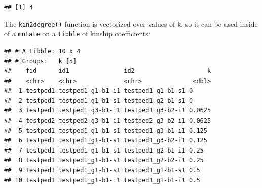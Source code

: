 \documentclass[9pt,a4paper,]{extarticle}
\newenvironment{Shaded}{\begin{snugshade}}{\end{snugshade}}
\newcommand{\CommentTok}[1]{\textcolor[rgb]{0.56,0.35,0.01}{\textit{#1}}}
\newcommand{\DataTypeTok}[1]{\textcolor[rgb]{0.13,0.29,0.53}{#1}}
\newcommand{\DecValTok}[1]{\textcolor[rgb]{0.00,0.00,0.81}{#1}}
\newcommand{\KeywordTok}[1]{\textcolor[rgb]{0.13,0.29,0.53}{\textbf{#1}}}
\newcommand{\NormalTok}[1]{#1}
\newcommand{\OperatorTok}[1]{\textcolor[rgb]{0.81,0.36,0.00}{\textbf{#1}}}
\newcommand{\StringTok}[1]{\textcolor[rgb]{0.31,0.60,0.02}{#1}}
\begin{document}
\begin{verbatim}
## [1] 4
\end{verbatim}

The \texttt{kin2degree()} function is vectorized over values of \texttt{k}, so it can be used inside of a \texttt{mutate} on a \texttt{tibble} of kinship coefficients:

\begin{Shaded}
\end{Shaded}

\begin{verbatim}
## # A tibble: 10 x 4
## # Groups:   k [5]
##    fid      id1               id2                    k
##    <chr>    <chr>             <chr>              <dbl>
##  1 testped1 testped1_g1-b1-i1 testped1_g1-b1-s1 0     
##  2 testped1 testped1_g1-b1-s1 testped1_g2-b1-s1 0     
##  3 testped1 testped1_g3-b1-i1 testped1_g3-b2-i1 0.0625
##  4 testped2 testped2_g3-b1-i1 testped2_g3-b2-i1 0.0625
##  5 testped1 testped1_g1-b1-s1 testped1_g3-b1-i1 0.125 
##  6 testped1 testped1_g1-b1-s1 testped1_g3-b2-i1 0.125 
##  7 testped1 testped1_g1-b1-s1 testped1_g2-b1-i1 0.25  
##  8 testped1 testped1_g1-b1-s1 testped1_g2-b2-i1 0.25  
##  9 testped1 testped1_g1-b1-s1 testped1_g1-b1-s1 0.5   
## 10 testped1 testped1_g1-b1-i1 testped1_g1-b1-i1 0.5
\end{verbatim}

\begin{Shaded}
\end{Shaded}
\end{document}
